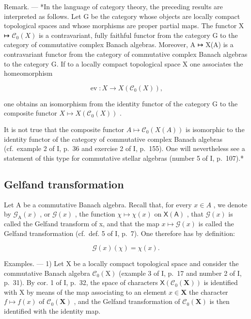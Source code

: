 Remark. --- *In the language of category theory, the preceding results are interpreted as follows. Let G be the category whose objects are locally compact topological spaces and whose morphisms are proper partial maps. The functor X ↦ \(\mathcal{C}_0(X)\) is a contravariant, fully faithful functor from the category G to the category of commutative complex Banach algebras. Moreover, A ↦ X(A) is a contravariant functor from the category of commutative complex Banach algebras to the category G. If to a locally compact topological space X one associates the homeomorphism

\[
\operatorname{ev} \colon X \to X (\mathscr {C} _ {0} (X)),
\]

one obtains an isomorphism from the identity functor of the category G to the composite functor \(X \mapsto X(\mathcal{C}_{0}(X))\) .

It is not true that the composite functor \(A \mapsto \mathcal{C}_{0}(X(A))\) is isomorphic to the identity functor of the category of commutative complex Banach algebras (cf.~example 2 of I, p.~36 and exercise 2 of I, p.~155). One will nevertheless see a statement of this type for commutative stellar algebras (number 5 of I, p.~107).*

\subsection{Gelfand transformation}

Let A be a commutative Banach algebra. Recall that, for every \(x \in A\) , we denote by \(\mathcal{G}_{\mathrm{A}}(x)\) , or \(\mathcal{G}(x)\) , the function \(\chi \mapsto \chi(x)\) on \(\mathsf{X}(\mathsf{A})\) , that \(\mathcal{G}(x)\) is called the Gelfand transform of x, and that the map \(x \mapsto \mathcal{G}(x)\) is called the Gelfand transformation (cf.~def. 5 of I, p.~7). One therefore has by definition:

\[
\mathcal {G} (x) (\chi) = \chi (x).
\]

Examples. --- 1) Let X be a locally compact topological space and consider the commutative Banach algebra \(\mathcal{C}_{0}(\mathrm{X})\) (example 3 of I, p.~17 and number 2 of I, p.~31). By cor. 1 of I, p.~32, the space of characters \(\mathsf{X}(\mathcal{C}_{0}(\mathbf{X}))\) is identified with X by means of the map associating to an element \(x \in \mathbf{X}\) the character \(f \mapsto f(x)\) of \(\mathcal{C}_{0}(\mathbf{X})\) , and the Gelfand transformation of \(\mathcal{C}_{0}(\mathbf{X})\) is then identified with the identity map.

